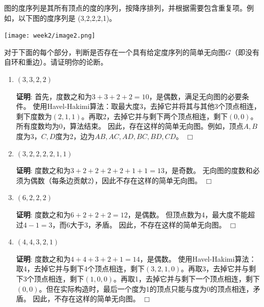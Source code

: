 \documentclass[11pt]{article}
\newenvironment{qparts}{\begin{enumerate}[{(}a{)}]}{\end{enumerate}}
\def\endproofmark{$\Box$}
\newenvironment{proof}{\par{\bf 证明}:}{\endproofmark\smallskip}
\begin{document}
图的度序列是其所有顶点的度的序列，按降序排列，并根据需要包含重复项。例如，以下图的度序列是 (3,2,2,2,1)。
\begin{center}
  \texttt{[image: week2/image2.png]}
\end{center}
对于下面的每个部分，判断是否存在一个具有给定度序列的简单无向图$G$（即没有自环和重边）。请证明你的论断。

\begin{qparts}
\item $(3,3,2,2)$

\begin{proof}
首先，度数之和为$3+3+2+2=10$，是偶数，满足无向图的必要条件。\newline
使用Havel-Hakimi算法：取最大度3，去掉它并将其与其他3个顶点相连，剩下度数为$(2,1,1)$。再取2，去掉它并与剩下两个顶点相连，剩下$(0,0)$。所有度数均为0，算法结束。\newline
因此，存在这样的简单无向图。例如，顶点$A,B$度为3，$C,D$度为2，边为$AB,AC,AD,BC,BD,CD$。
\end{proof}

\item $(3,2,2,2,2,1,1)$

\begin{proof}
度数之和为$3+2+2+2+2+1+1=13$，是奇数。\newline
无向图的度数和必须为偶数（每条边贡献2），因此不存在这样的简单无向图。
\end{proof}

\item $(6,2,2,2)$

\begin{proof}
度数之和为$6+2+2+2=12$，是偶数。\newline
但顶点数为4，最大度不能超过$4-1=3$，而6大于3，矛盾。\newline
因此，不存在这样的简单无向图。
\end{proof}

\item $(4,4,3,2,1)$

\begin{proof}
度数之和为$4+4+3+2+1=14$，是偶数。\newline
使用Havel-Hakimi算法：取4，去掉它并与剩下4个顶点相连，剩下$(3,2,1,0)$。再取3，去掉它并与剩下3个顶点相连，剩下$(1,0,0)$。再取1，去掉它并与剩下一个顶点相连，剩下$(0,0)$。但在实际构造时，最后一个度为1的顶点只能与度为0的顶点相连，矛盾。\newline
因此，不存在这样的简单无向图。
\end{proof}
\end{qparts}
\end{document}
